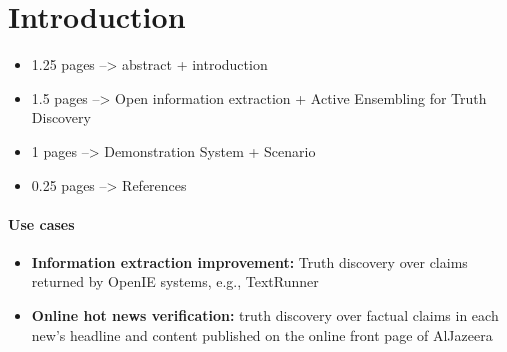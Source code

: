 \section{Introduction}
\begin{itemize}
 \item 1.25 pages --> abstract + introduction
 \item 1.5 pages --> Open information extraction + Active Ensembling for Truth Discovery 
 \item 1 pages --> Demonstration System + Scenario
 \item 0.25 pages --> References
\end{itemize}

\paragraph{Use cases}
\begin{itemize}
 \item \textbf{Information extraction improvement:} Truth discovery over claims returned by OpenIE systems, e.g., TextRunner
 \item \textbf{Online hot news verification:} truth discovery over factual claims in each new's headline and
 content published on the online front page of AlJazeera
\end{itemize}

